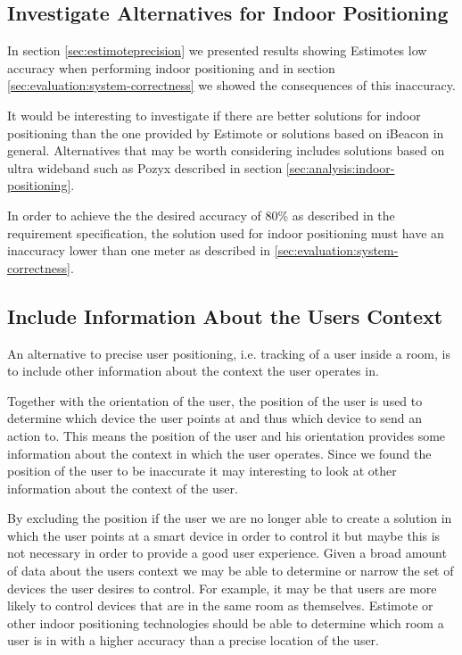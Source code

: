 \subsection{Investigate Alternatives for Indoor Positioning}

In section \ref{sec:estimoteprecision} we presented results showing Estimotes low accuracy when performing indoor positioning and in section \ref{sec:evaluation:system-correctness} we showed the consequences of this inaccuracy.

It would be interesting to investigate if there are better solutions for indoor positioning than the one provided by Estimote or solutions based on iBeacon in general. Alternatives that may be worth considering includes solutions based on ultra wideband such as Pozyx described in section \ref{sec:analysis:indoor-positioning}.

In order to achieve the the desired accuracy of 80\% as described in the requirement specification, the solution used for indoor positioning must have an inaccuracy lower than one meter as described in \ref{sec:evaluation:system-correctness}.

\subsection{Include Information About the Users Context}

An alternative to precise user positioning, i.e. tracking of a user inside a room, is to include other information about the context the user operates in.

Together with the orientation of the user, the position of the user is used to determine which device the user points at and thus which device to send an action to. This means the position of the user and his orientation provides some information about the context in which the user operates. Since we found the position of the user to be inaccurate it may interesting to look at other information about the context of the user.

By excluding the position if the user we are no longer able to create a solution in which the user points at a smart device in order to control it but maybe this is not necessary in order to provide a good user experience. Given a broad amount of data about the users context we may be able to determine or narrow the set of devices the user desires to control. For example, it may be that users are more likely to control devices that are in the same room as themselves. Estimote or other indoor positioning technologies should be able to determine which room a user is in with a higher accuracy than a precise location of the user.

